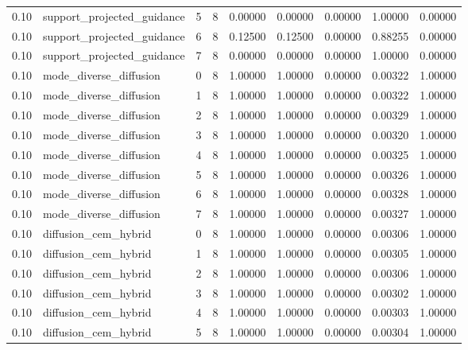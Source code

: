 \documentclass{article}
\begin{document}
\begin{table}[tbp]
{\begin{tabular}{lllllllll}
0.10 & support\_projected\_guidance & 5 & 8 & 0.00000 & 0.00000 & 0.00000 & 1.00000 & 0.00000 \\
0.10 & support\_projected\_guidance & 6 & 8 & 0.12500 & 0.12500 & 0.00000 & 0.88255 & 0.00000 \\
0.10 & support\_projected\_guidance & 7 & 8 & 0.00000 & 0.00000 & 0.00000 & 1.00000 & 0.00000 \\
0.10 & mode\_diverse\_diffusion & 0 & 8 & 1.00000 & 1.00000 & 0.00000 & 0.00322 & 1.00000 \\
0.10 & mode\_diverse\_diffusion & 1 & 8 & 1.00000 & 1.00000 & 0.00000 & 0.00322 & 1.00000 \\
0.10 & mode\_diverse\_diffusion & 2 & 8 & 1.00000 & 1.00000 & 0.00000 & 0.00329 & 1.00000 \\
0.10 & mode\_diverse\_diffusion & 3 & 8 & 1.00000 & 1.00000 & 0.00000 & 0.00320 & 1.00000 \\
0.10 & mode\_diverse\_diffusion & 4 & 8 & 1.00000 & 1.00000 & 0.00000 & 0.00325 & 1.00000 \\
0.10 & mode\_diverse\_diffusion & 5 & 8 & 1.00000 & 1.00000 & 0.00000 & 0.00326 & 1.00000 \\
0.10 & mode\_diverse\_diffusion & 6 & 8 & 1.00000 & 1.00000 & 0.00000 & 0.00328 & 1.00000 \\
0.10 & mode\_diverse\_diffusion & 7 & 8 & 1.00000 & 1.00000 & 0.00000 & 0.00327 & 1.00000 \\
0.10 & diffusion\_cem\_hybrid & 0 & 8 & 1.00000 & 1.00000 & 0.00000 & 0.00306 & 1.00000 \\
0.10 & diffusion\_cem\_hybrid & 1 & 8 & 1.00000 & 1.00000 & 0.00000 & 0.00305 & 1.00000 \\
0.10 & diffusion\_cem\_hybrid & 2 & 8 & 1.00000 & 1.00000 & 0.00000 & 0.00306 & 1.00000 \\
0.10 & diffusion\_cem\_hybrid & 3 & 8 & 1.00000 & 1.00000 & 0.00000 & 0.00302 & 1.00000 \\
0.10 & diffusion\_cem\_hybrid & 4 & 8 & 1.00000 & 1.00000 & 0.00000 & 0.00303 & 1.00000 \\
0.10 & diffusion\_cem\_hybrid & 5 & 8 & 1.00000 & 1.00000 & 0.00000 & 0.00304 & 1.00000 \\
\bottomrule
\end{tabular}
}
\end{table}

\clearpage
\end{document}
